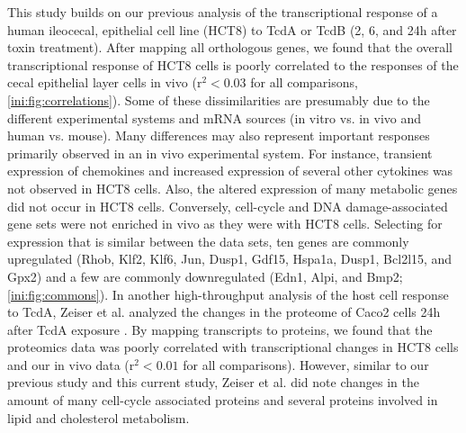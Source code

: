 This study builds on our previous analysis of the transcriptional 
response of a human ileocecal, epithelial cell line (HCT8) to 
TcdA or TcdB (2, 6, and 24h after toxin treatment). After mapping 
all orthologous genes, we found that the overall transcriptional 
response of HCT8 cells is poorly correlated to the responses of 
the cecal epithelial layer cells in vivo ($\text{r}^{2}<0.03$ 
for all comparisons, \autoref{ini:fig:correlations}). Some of 
these dissimilarities are presumably due to the different 
experimental systems and mRNA sources (in vitro vs. in vivo 
and human vs. mouse). Many differences may also represent 
important responses primarily observed in an in vivo 
experimental system. For instance, transient expression 
of chemokines and increased expression of several other 
cytokines was not observed in HCT8 cells. Also, the altered 
expression of many metabolic genes did not occur in HCT8 
cells. Conversely, cell-cycle and DNA damage-associated 
gene sets were not enriched in vivo as they were with HCT8 
cells. Selecting for expression that is similar between the 
data sets, ten genes are commonly upregulated (Rhob, Klf2, 
Klf6, Jun, Dusp1, Gdf15, Hspa1a, Dusp1, Bcl2l15, and Gpx2) and 
a few are commonly downregulated (Edn1, Alpi, and Bmp2; 
\autoref{ini:fig:commons}). In another high-throughput 
analysis of the host cell response to TcdA, Zeiser et al. 
analyzed the changes in the proteome of Caco2 cells 24h after 
TcdA exposure \cite{Zeiser:2013cu}. By mapping transcripts to 
proteins, we found that the proteomics data was poorly correlated 
with transcriptional changes in HCT8 cells and our in vivo 
data ($\text{r}^{2}<0.01$ for all comparisons). However, similar 
to our previous study and this current study, Zeiser et al. did 
note changes in the amount of many cell-cycle associated 
proteins and several proteins involved in lipid and cholesterol 
metabolism.

